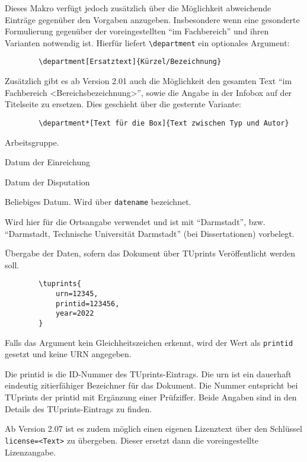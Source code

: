\documentclass[
	german,%
	accentcolor=9c,%
	ruledheaders=chapter,%
	class=book,%
	thesis={%
			type=dr,
			dr=rernat
		},
	fontsize=11pt,%
	parskip=half-,%
	custommargins=true,%
	marginpar=false,%
]{tudapub}
\newcommand*{\code}[1]{\texttt{#1}}
\begin{document}
\begin{description}
	      Dieses Makro verfügt jedoch zusätzlich über die Möglichkeit abweichende Einträge gegenüber den Vorgaben anzugeben. Insbesondere wenn eine gesonderte Formulierung gegenüber der voreingestellten \enquote{im Fachbereich} und ihren Varianten notwendig ist. Hierfür liefert \code{\textbackslash{}department} ein optionales Argument:

\begin{verbatim}
        \department[Ersatztext]{Kürzel/Bezeichnung}
\end{verbatim}
	      Zusätzlich gibt es ab Version 2.01 auch die Möglichkeit den gesamten Text \enquote{im Fachbereich <Bereichsbezeichnung>}, sowie die Angabe in der Infobox auf der Titelseite zu ersetzen. Dies geschieht über die gesternte Variante:
\begin{verbatim}
        \department*[Text für die Box]{Text zwischen Typ und Autor}
\end{verbatim}
	\item[group] Arbeitsgruppe.
	\item[submissiondate] Datum der Einreichung
	\item[examdate] Datum der Disputation
	\item[date] Beliebiges Datum. Wird über \verb|datename| bezeichnet.
	\item[publishers] Wird hier für die Ortsangabe verwendet und ist mit \enquote{Darmstadt}, bzw. \enquote{Darmstadt, Technische Universität Darmstadt} (bei Dissertationen) vorbelegt.
	\item[tuprints] \label{page:tuprints}Übergabe der Daten, sofern das Dokument über TUprints Veröffentlicht werden soll.
\begin{verbatim}
        \tuprints{
            urn=12345,
            printid=123456,
            year=2022
        }
\end{verbatim}
	      Falls das Argument kein Gleichheitszeichen erkennt, wird der Wert als \code{printid} gesetzt und keine URN angegeben.

	      Die printid is die ID-Nummer des TUprints-Eintrags. Die urn ist ein dauerhaft eindeutig zitierfähiger Bezeichner für das Dokument. Die Nummer entspricht bei TUprints der printid mit Ergänzung einer Prüfziffer. Beide Angaben sind in den Details des TUprints-Eintrags zu finden.

	      Ab Version 2.07 ist es zudem möglich einen eigenen Lizenztext über den Schlüssel \verb|license=<Text>| zu übergeben. Dieser ersetzt dann die voreingestellte Lizenzangabe.


\end{description}
\end{document}
